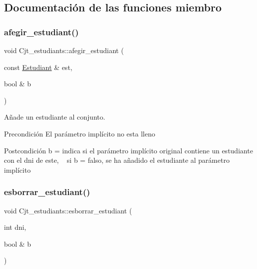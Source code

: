 \subsection{Documentación de las funciones miembro}
\mbox{\label{class_cjt__estudiants_a4188715904e017fa15b9ad8bc63112b6}} 
\subsubsection{\texorpdfstring{afegir\+\_\+estudiant()}{afegir\_estudiant()}}
{\footnotesize\ttfamily void Cjt\+\_\+estudiants\+::afegir\+\_\+estudiant (\begin{DoxyParamCaption}\item[{const \hyperlink{class_estudiant}{Estudiant} \&}]{est,  }\item[{bool \&}]{b }\end{DoxyParamCaption})}



Añade un estudiante al conjunto. 

\begin{DoxyPrecond}{Precondición}
El parámetro implícito no esta lleno 
\end{DoxyPrecond}
\begin{DoxyPostcond}{Postcondición}
b = indica si el parámetro implícito original contiene un estudiante con el dni de este, ~\newline
si b = falso, se ha añadido el estudiante al parámetro implícito 
\end{DoxyPostcond}
\mbox{\label{class_cjt__estudiants_a6632e0cecaa9d698cb51da07c9e58402}} 
\subsubsection{\texorpdfstring{esborrar\+\_\+estudiant()}{esborrar\_estudiant()}}
{\footnotesize\ttfamily void Cjt\+\_\+estudiants\+::esborrar\+\_\+estudiant (\begin{DoxyParamCaption}\item[{int}]{dni,  }\item[{bool \&}]{b }\end{DoxyParamCaption})}




